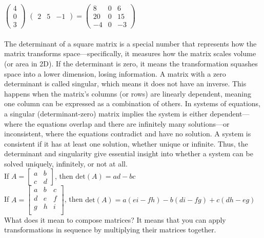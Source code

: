 \documentclass{article}
\begin{document}
$
\begin{pmatrix}
4\\
0\\
3
\end{pmatrix}
$
$
\begin{pmatrix}
2 & 5 & -1
\end{pmatrix}
=
\begin{pmatrix}
8 & 0 & 6\\
	20 & 0 & 15\\
-4 & 0 & -3
\end{pmatrix}
$\\\\

The determinant of a square matrix is a special number that represents how the matrix transforms space—specifically, it measures how the matrix scales volume (or area in 2D). If the determinant is zero, it means the transformation squashes space into a lower dimension, losing information. A matrix with a zero determinant is called singular, which means it does not have an inverse. This happens when the matrix’s columns (or rows) are linearly dependent, meaning one column can be expressed as a combination of others. In systems of equations, a singular (determinant-zero) matrix implies the system is either dependent—where the equations overlap and there are infinitely many solutions—or inconsistent, where the equations contradict and have no solution. A system is consistent if it has at least one solution, whether unique or infinite. Thus, the determinant and singularity give essential insight into whether a system can be solved uniquely, infinitely, or not at all.\\

If
$ A = 
\begin{bmatrix}
a & b\\
c & d
\end{bmatrix}
$, then $\text{det}(A) = ad - bc$\\

If
$ A = 
\begin{bmatrix}
a & b & c\\
d & e & f\\
g & h & i\\
\end{bmatrix}
$, then $\text{det}(A) = a(ei - fh) - b(di - fg) + c(dh - eg)$\\

What does it mean to compose matrices? It means that you can apply transformations in sequence by multiplying their matrices together.\\
\end{document}
